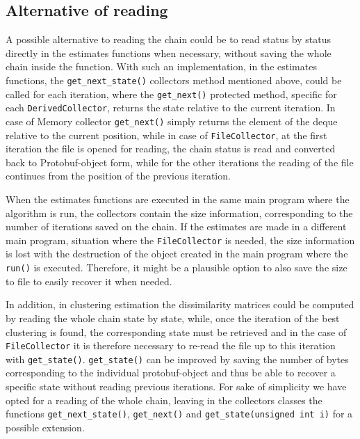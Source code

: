 \subsection{Alternative of reading}

A possible alternative to reading the chain could be to read status by status directly in the estimates functions when necessary, without saving the whole chain inside the function. 
With such an implementation, in the estimates functions, the \verb|get_next_state()| collectors method mentioned above, could be called for each iteration, where the \verb|get_next()| protected method, specific for each \verb|DerivedCollector|, returns the state relative to the current iteration. 
In case of Memory collector \verb|get_next()| simply returns the element of the deque relative to the current position, while in case of \verb|FileCollector|, at the first iteration the file is opened for reading, the chain status is read and converted back to Protobuf-object form, while for the other iterations the reading of the file continues from the position of the previous iteration.

When the estimates functions are executed in the same main program where the algorithm is run, the collectors contain the size information, corresponding to the number of iterations saved on the chain. 
If the estimates are made in a different main program, situation where the \verb|FileCollector| is needed, the size information is lost with the destruction of the object created in the main program where the \verb|run()| is executed. Therefore, it might be a plausible option to also save the size to file to easily recover it when needed. 

In addition, in clustering estimation the dissimilarity matrices could be computed by reading the whole chain state by state, while, once the iteration of the best clustering is found, the corresponding state must be retrieved and in the case of \verb|FileCollector| it is therefore necessary to re-read the file up to this iteration with \verb|get_state()|. \verb|get_state()| can be improved by saving the number of bytes corresponding to the individual protobuf-object and thus be able to recover a specific state without reading previous iterations. For sake of simplicity we have opted for a reading of the whole chain, leaving in the collectors classes the functions \verb|get_next_state()|, \verb|get_next()| and \verb|get_state(unsigned int i)| for a possible extension.
